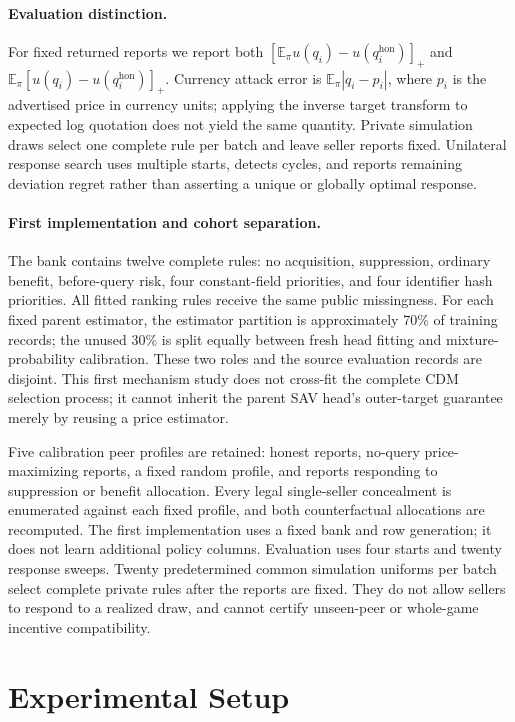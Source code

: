 \documentclass[10pt,journal]{IEEEtran}
\begin{document}
\paragraph{Evaluation distinction.}
For fixed returned reports we report both
$[\mathbb{E}_\pi u(q_i)-u(q_i^{\mathrm{hon}})]_+$ and
$\mathbb{E}_\pi[u(q_i)-u(q_i^{\mathrm{hon}})]_+$. Currency attack error is
$\mathbb{E}_\pi|q_i-p_i|$, where $p_i$ is the advertised price in currency
units; applying the inverse target transform to expected
log quotation does not yield the same quantity. Private simulation draws
select one complete rule per batch and leave seller reports fixed. Unilateral
response search uses multiple starts, detects cycles, and reports remaining
deviation regret rather than asserting a unique or globally optimal response.

\paragraph{First implementation and cohort separation.}
The bank contains twelve complete rules: no acquisition, suppression, ordinary
benefit, before-query risk, four constant-field priorities, and four identifier
hash priorities. All fitted ranking rules receive the same public missingness.
For each fixed parent estimator, the estimator partition is approximately
70\% of training records; the unused 30\% is split equally between fresh
head fitting and mixture-probability calibration. These two roles and the
source evaluation records are disjoint. This first mechanism study does not
cross-fit the complete CDM selection process; it cannot inherit the
parent SAV head's outer-target guarantee merely by reusing a price estimator.

Five calibration peer profiles are retained: honest reports, no-query
price-maximizing reports, a fixed random profile, and reports responding to
suppression or benefit allocation. Every legal single-seller concealment is
enumerated against each fixed profile, and both counterfactual allocations
are recomputed. The first implementation uses a fixed bank and row generation;
it does not learn additional policy columns. Evaluation uses four starts and
twenty response sweeps. Twenty predetermined common simulation uniforms per
batch select complete private rules after the reports are fixed. They do not
allow sellers to respond to a realized draw, and cannot certify unseen-peer
or whole-game incentive compatibility.

\section{Experimental Setup}
\end{document}
